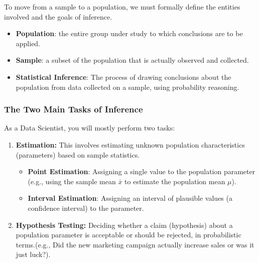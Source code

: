 \documentclass[11pt]{article}
\theoremstyle{smallexample}
\begin{document}
To move from a sample to a population, we must formally define the entities involved and the goals of inference.
\begin{itemize}[label=$\cdot$]
    \item \textbf{Population}: the entire group under study to which conclusions are to be applied.
    \item \textbf{Sample}: a subset of the population that is actually observed and collected.
    \item \textbf{Statistical Inference}: The process of drawing conclusions about the population from data collected on a sample, using probability reasoning.
\end{itemize}

\subsubsection{The Two Main Tasks of Inference}
As a Data Scientist, you will mostly perform two tasks:
\begin{enumerate}
\item \textbf{Estimation:}  This involves estimating unknown population characteristics (parameters) based on sample statistics.
 \begin{itemize}
  \item \textbf{Point Estimation}: Assigning a single value to the population parameter (e.g., using the sample mean $\bar{x}$ to estimate the population mean $\mu$).
  \item \textbf{Interval Estimation}: Assigning an interval of plausible values (a confidence interval) to the parameter.
  \end{itemize}
    \item \textbf{Hypothesis Testing:} Deciding whether a claim (hypothesis) about a population parameter is acceptable or should be rejected, in probabilistic terms.(e.g., Did the new marketing campaign actually increase sales or was it just luck?).
\end{enumerate}
\end{document}
